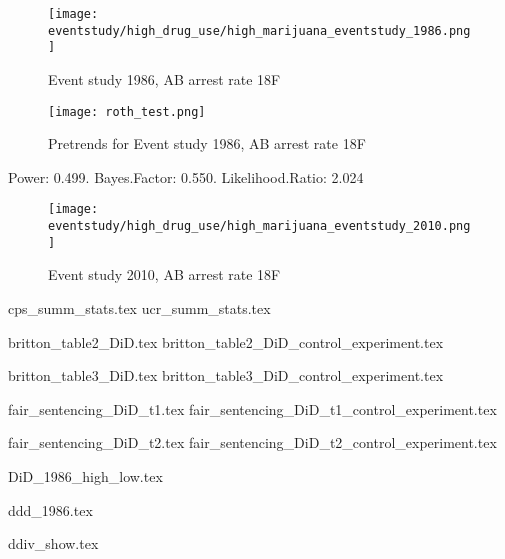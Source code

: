 \documentclass{article}
\begin{document}
\clearpage

\begin{figure}[h]
  \caption{Event study 1986, AB arrest rate 18F}
  \centering
  \texttt{[image: eventstudy/high\_drug\_use/high\_marijuana\_eventstudy\_1986.png]}
  \label{fig:TBD}
\end{figure}

\begin{figure*}[h]
  \caption{Pretrends for Event study 1986, AB arrest rate 18F}
  \texttt{[image: roth\_test.png]}
\end{figure*}

Power: 0.499. Bayes.Factor: 0.550.  Likelihood.Ratio: 2.024

\clearpage

\begin{figure}[h]
  \caption{Event study 2010, AB arrest rate 18F}
  \centering
  \texttt{[image: eventstudy/high\_drug\_use/high\_marijuana\_eventstudy\_2010.png]}
  \label{fig:TBD}
\end{figure}

\clearpage




{cps_summ_stats.tex}
{ucr_summ_stats.tex}


{britton_table2_DiD.tex}
{britton_table2_DiD_control_experiment.tex}

{britton_table3_DiD.tex}
{britton_table3_DiD_control_experiment.tex}

{fair_sentencing_DiD_t1.tex}
{fair_sentencing_DiD_t1_control_experiment.tex}

{fair_sentencing_DiD_t2.tex}
{fair_sentencing_DiD_t2_control_experiment.tex}

{DiD_1986_high_low.tex}

{ddd_1986.tex}

{ddiv_show.tex}
\end{document}
